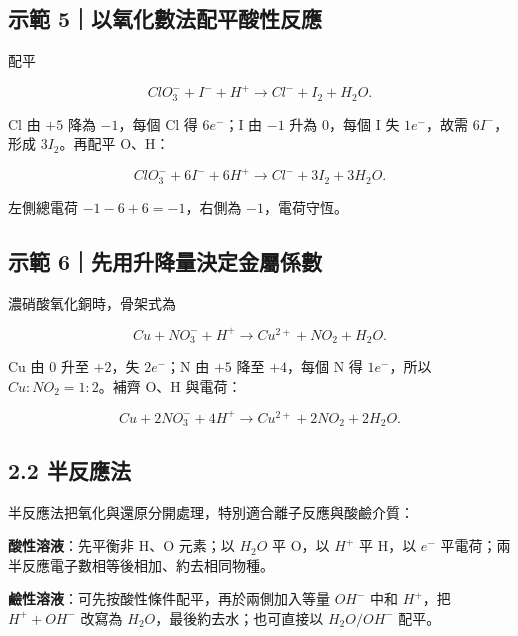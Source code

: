 \documentclass[11pt,a4paper]{article}
\begin{document}
\begin{HandoutWorkedExample}

\subsection{示範 5｜以氧化數法配平酸性反應}\label{ux793aux7bc4-5ux4ee5ux6c27ux5316ux6578ux6cd5ux914dux5e73ux9178ux6027ux53cdux61c9}

配平

\[
ClO_3^-+I^-+H^+\rightarrow Cl^-+I_2+H_2O.
\]

Cl 由 \(+5\) 降為 \(-1\)，每個 Cl 得 \(6e^-\)；I 由 \(-1\) 升為 \(0\)，每個 I 失 \(1e^-\)，故需 \(6I^-\)，形成 \(3I_2\)。再配平 O、H：

\[
ClO_3^-+6I^-+6H^+\rightarrow Cl^-+3I_2+3H_2O.
\]

左側總電荷 \(-1-6+6=-1\)，右側為 \(-1\)，電荷守恆。

\end{HandoutWorkedExample}

\begin{HandoutWorkedExample}

\subsection{示範 6｜先用升降量決定金屬係數}\label{ux793aux7bc4-6ux5148ux7528ux5347ux964dux91cfux6c7aux5b9aux91d1ux5c6cux4fc2ux6578}

濃硝酸氧化銅時，骨架式為

\[
Cu+NO_3^-+H^+\rightarrow Cu^{2+}+NO_2+H_2O.
\]

Cu 由 \(0\) 升至 \(+2\)，失 \(2e^-\)；N 由 \(+5\) 降至 \(+4\)，每個 N 得 \(1e^-\)，所以 \(Cu:NO_2=1:2\)。補齊 O、H 與電荷：

\[
Cu+2NO_3^-+4H^+\rightarrow Cu^{2+}+2NO_2+2H_2O.
\]

\end{HandoutWorkedExample}

\subsection{2.2 半反應法}\label{ux534aux53cdux61c9ux6cd5}

半反應法把氧化與還原分開處理，特別適合離子反應與酸鹼介質：

\textbf{酸性溶液}：先平衡非 H、O 元素；以 \(H_2O\) 平 O，以 \(H^+\) 平 H，以 \(e^-\) 平電荷；兩半反應電子數相等後相加、約去相同物種。

\textbf{鹼性溶液}：可先按酸性條件配平，再於兩側加入等量 \(OH^-\) 中和 \(H^+\)，把 \(H^++OH^-\) 改寫為 \(H_2O\)，最後約去水；也可直接以 \(H_2O/OH^-\) 配平。
\end{document}

